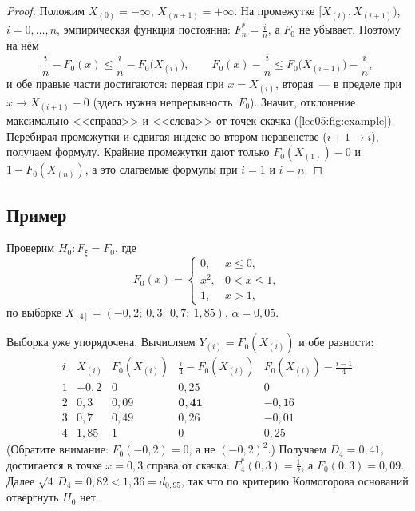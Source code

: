 \begin{addendum}
\begin{proof}
  Положим $X_{(0)} = -\infty$, $X_{(n+1)} = +\infty$. На промежутке
  $[X_{(i)}, X_{(i+1)})$, $i = 0, \ldots, n$, эмпирическая функция постоянна:
  $F_n^* = \frac{i}{n}$, а $F_0$ не убывает. Поэтому на нём
  \[
    \frac{i}{n} - F_0(x) \le \frac{i}{n} - F_0\bigl(X_{(i)}\bigr), \qquad
    F_0(x) - \frac{i}{n} \le F_0\bigl(X_{(i+1)}\bigr) - \frac{i}{n},
  \]
  и обе правые части достигаются: первая при $x = X_{(i)}$, вторая~--- в пределе
  при $x \to X_{(i+1)} - 0$ (здесь нужна непрерывность~$F_0$). Значит, отклонение
  максимально <<справа>> и <<слева>> от точек скачка (\cref{lec05:fig:example}).
  Перебирая промежутки и сдвигая индекс во втором неравенстве ($i + 1 \to i$),
  получаем формулу. Крайние промежутки дают только $F_0(X_{(1)}) - 0$ и
  $1 - F_0(X_{(n)})$, а это слагаемые формулы при $i = 1$ и $i = n$.
\end{proof}
\end{addendum}

\subsection{Пример}
\label{lec05:example}

\begin{example}
  \label{lec05:ex}
  Проверим $H_0 \colon F_\xi = F_0$, где
  \[
    F_0(x) =
    \begin{cases}
      0,   & x \le 0, \\
      x^2, & 0 < x \le 1, \\
      1,   & x > 1,
    \end{cases}
  \]
  по выборке $X_{[4]} = (-0{,}2;\ 0{,}3;\ 0{,}7;\ 1{,}85)$, $\alpha = 0{,}05$.

  Выборка уже упорядочена. Вычисляем $Y_{(i)} = F_0(X_{(i)})$ и обе разности:
  \[
    \begin{array}{c|c|c|c|c}
      i & X_{(i)} & F_0(X_{(i)}) & \frac{i}{4} - F_0(X_{(i)}) & F_0(X_{(i)}) - \frac{i-1}{4} \\ \hline
      1 & -0{,}2  & 0            & 0{,}25                     & 0 \\
      2 & 0{,}3   & 0{,}09       & \mathbf{0{,}41}            & -0{,}16 \\
      3 & 0{,}7   & 0{,}49       & 0{,}26                     & -0{,}01 \\
      4 & 1{,}85  & 1            & 0                          & 0{,}25
    \end{array}
  \]
  (Обратите внимание: $F_0(-0{,}2) = 0$, а не $(-0{,}2)^2$.) Получаем $D_4 = 0{,}41$,
  достигается в точке $x = 0{,}3$ справа от скачка: $F_4^*(0{,}3) = \frac12$, а
  $F_0(0{,}3) = 0{,}09$. Далее $\sqrt{4}\, D_4 = 0{,}82 < 1{,}36 = d_{0{,}95}$, так что
  по критерию Колмогорова оснований отвергнуть $H_0$ нет.
\end{example}

